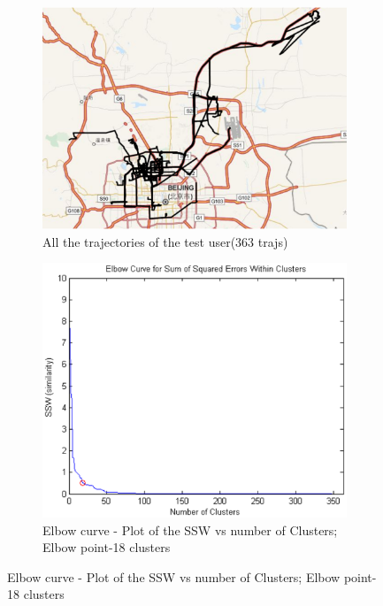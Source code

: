 \begin{itemize}
\begin{figure}
	\begin{subfigure}{.5\textwidth}
    	\centering     
		\includegraphics[scale=0.4]{figs/new/allTrajs.eps}
		\caption{All the trajectories of the test user(363 trajs)}
		\label{fig:alltrajs}  
    \end{subfigure}%
	\begin{subfigure}{.5\textwidth}
       \centering     
		\includegraphics[scale=0.5]{figs/new/elbow.eps}
		\caption{Elbow curve - Plot of the SSW vs number of Clusters; Elbow point-18 clusters}
		\label{fig:elbow}  
    \end{subfigure}

\end{figure}
\end{itemize}
